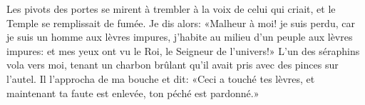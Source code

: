 Les pivots des portes se mirent à trembler à la voix de celui qui criait,
	et le Temple se remplissait de fumée.
Je dis alors: «Malheur à moi!
	je suis perdu, car je suis un homme aux lèvres impures,
	j’habite au milieu d’un peuple aux lèvres impures:
	et mes yeux ont vu le Roi, le Seigneur de l’univers!»
L’un des séraphins vola vers moi,
	tenant un charbon brûlant qu’il avait pris avec des pinces sur l’autel.
Il l’approcha de ma bouche et dit:
	«Ceci a touché tes lèvres,
	et maintenant ta faute est enlevée, ton péché est pardonné.»
